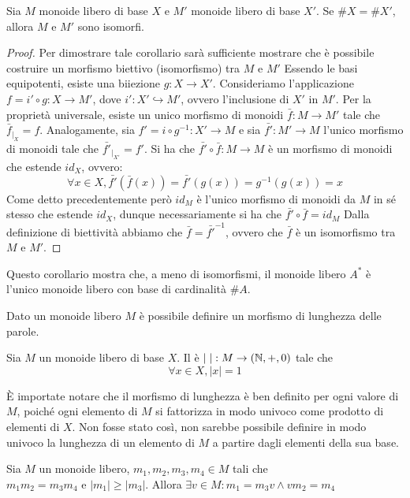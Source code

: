 \begin{corollary}
  Sia \(M\) monoide libero di base \(X\) e \(M'\) monoide libero di base \(X'\).
  Se \(\#X = \#X'\), allora \(M\) e \(M'\) sono isomorfi.
\end{corollary}

\begin{proof}
  Per dimostrare tale corollario sarà sufficiente mostrare che è possibile costruire un morfismo biettivo (isomorfismo) tra \(M\) e \(M'\)
  Essendo le basi equipotenti, esiste una biiezione \(g: X \to X'\).
  Consideriamo l'applicazione \(f = i' \circ g : X \to M'\), dove \(i': X' \hookrightarrow M'\), ovvero l'inclusione di \(X'\) in \(M'\).
  Per la proprietà universale, esiste un unico morfismo di monoidi \(\bar{f}: M \to M'\) tale che \(\bar{f}_{|_X} = f\).
  Analogamente, sia \(f'= i \circ g^{-1} : X' \to M\) e sia \(\bar{f'}: M' \to M\) l'unico morfismo di monoidi tale che \(\bar{f'}_{|_{X'}} = f'\).
  Si ha che \(\bar{f'} \circ \bar{f}: M \to M\) è un morfismo di monoidi che estende \(id_X\), ovvero:
  \[\forall x \in X, \bar{f'} (\bar{f}(x)) = \bar{f'}(g(x))= g^{-1}(g(x))= x\]
  Come detto precedentemente però \(id_M\) è l'unico morfismo di monoidi da \(M\) in sé stesso che estende \(id_X\), dunque necessariamente si ha che \(\bar{f'} \circ \bar{f} = id_M\)
  Dalla definizione di biettività abbiamo che \(\bar{f} = \bar{f'}^{-1} \), ovvero che \(\bar{f}\) è un isomorfismo tra \(M\) e \(M'\). 
\end{proof}
Questo corollario mostra che, a meno di isomorfismi, il monoide libero \(A^*\) è l'unico monoide libero con base di cardinalità \(\#A\).

Dato un monoide libero \(M\) è possibile definire un morfismo di lunghezza delle parole.
\begin{definition}
  Sia \(M\) un monoide libero di base \(X\).
  Il  è \(|\;|: M \to(\mathbb{N},+,0)\) tale che \[\forall x \in X, |x| = 1\]
\end{definition}

\begin{note}
  È importate notare che il morfismo di lunghezza è ben definito per ogni valore di \(M\), poiché ogni elemento di \(M\) si fattorizza in modo univoco come prodotto di elementi di \(X\).
  Non fosse stato così, non sarebbe possibile definire in modo univoco la lunghezza di un elemento di \(M\) a partire dagli elementi della sua base.
\end{note}

\begin{lemma}[Levi]
  Sia \(M\) un monoide libero, \(m_1,m_2,m_3,m_4 \in M\) tali che \(m_1m_2=m_3m_4 \text{ e } |m_1| \geq |m_3|\).
  Allora \(\exists v \in M: m_1 = m_3v \land vm_2 = m_4\)
\end{lemma}

